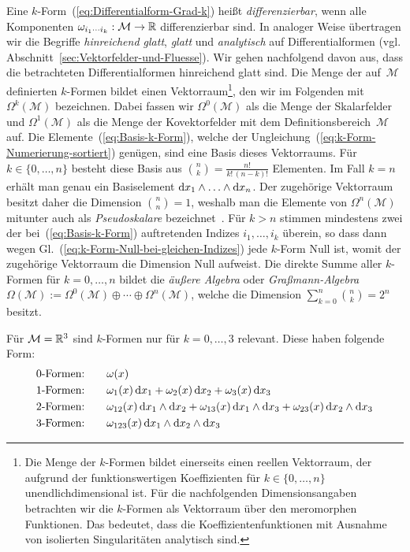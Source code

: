 Eine $k$-Form~(\ref{eq:Differentialform-Grad-k}) heißt \emph{differenzierbar},
wenn alle Komponenten $\omega_{i_{1}\cdots i_{k}}:\mathcal{M}\to{\mathbb{R}}$
differenzierbar sind. In analoger Weise übertragen wir die Begriffe
\emph{hinreichend glatt}, \emph{glatt} und \emph{analytisch} auf Differentialformen
(vgl. Abschnitt~\ref{sec:Vektorfelder-und-Fluesse}). Wir gehen nachfolgend
davon aus, dass die betrachteten Differentialformen hinreichend glatt
sind. Die Menge der auf~$\mathcal{M}$ definierten $k$-Formen bildet
einen Vektorraum\footnote{Die Menge der $k$-Formen bildet einerseits einen reellen Vektorraum,
der aufgrund der funktionswertigen Koeffizienten für $k\in\{0,\ldots,n\}$
unendlichdimensional ist.  Für die nachfolgenden Dimensionsangaben
betrachten wir die $k$-Formen als Vektorraum über den meromorphen
Funktionen. Das bedeutet, dass die Koeffizientenfunktionen mit Ausnahme
von isolierten Singularitäten analytisch sind.}, den wir im Folgenden mit $\Omega^{k}(\mathcal{M})$ bezeichnen.
Dabei fassen wir $\Omega^{0}(\mathcal{M})$ als die Menge der Skalarfelder
und $\Omega^{1}(\mathcal{M})$ als die Menge der Kovektorfelder mit
dem Definitionsbereich~$\mathcal{M}$ auf. Die Elemente~(\ref{eq:Basis-k-Form}),
welche der Ungleichung~(\ref{eq:k-Form-Numerierung-sortiert}) genügen,
sind eine Basis dieses Vektorraums. Für $k\in\{0,\ldots,n\}$ besteht
diese Basis aus ${n \choose k}=\frac{n!}{k!\,(n-k)!}$ Elementen.
Im Fall $k=n$ erhält man genau ein Basiselement ${\mathrm{d}} x_{1}\wedge\ldots\wedge{\mathrm{d}} x_{n}$.
Der zugehörige Vektorraum besitzt daher die Dimension ${n \choose n}=1$,
weshalb man die Elemente von $\Omega^{n}(\mathcal{M})$ mitunter auch
als \emph{Pseudoskalare} bezeichnet~\cite{hestenes1999}.
Für $k>n$ stimmen mindestens zwei der bei~(\ref{eq:Basis-k-Form})
auftretenden Indizes $i_{1},\ldots,i_{k}$ überein, so dass dann wegen
Gl.~(\ref{eq:k-Form-Null-bei-gleichen-Indizes}) jede $k$-Form Null
ist, womit der zugehörige Vektorraum die Dimension Null aufweist.
Die direkte Summe aller $k$-Formen für $k=0,\ldots,n$ bildet die
\emph{äußere Algebra}
oder \emph{Graßmann-Algebra}
$\Omega(\mathcal{M}):=\Omega^{0}(\mathcal{M})\oplus\cdots\oplus\Omega^{n}(\mathcal{M})$,
welche die Dimension $\sum_{k=0}^{n}{n \choose k}=2^{n}$ besitzt.
\begin{example}
Für $\mathcal{M}={\mathbb{R}}^{3}$ sind $k$-Formen nur für $k=0,\ldots,3$
relevant. Diese haben folgende Form:
\begin{align*}
0\text{-Formen:}\qquad & \omega(x)\\
1\text{-Formen:}\qquad & \omega_{1}(x)\,{\mathrm{d}} x_{1}+\omega_{2}(x)\,{\mathrm{d}} x_{2}+\omega_{3}(x)\,{\mathrm{d}} x_{3}\\
2\text{-Formen:}\qquad & \omega_{12}(x)\,{\mathrm{d}} x_{1}\wedge{\mathrm{d}} x_{2}+\omega_{13}(x)\,{\mathrm{d}} x_{1}\wedge{\mathrm{d}} x_{3}+\omega_{23}(x)\,{\mathrm{d}} x_{2}\wedge{\mathrm{d}} x_{3}\\
3\text{-Formen:}\qquad & \omega_{123}(x)\,{\mathrm{d}} x_{1}\wedge{\mathrm{d}} x_{2}\wedge{\mathrm{d}} x_{3}
\end{align*}
\end{example}
\medskip{}

